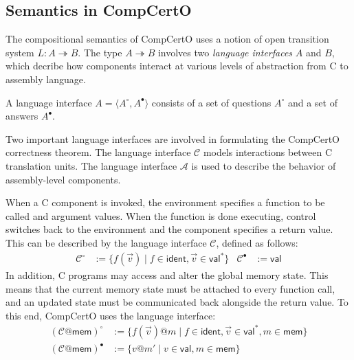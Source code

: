 \documentclass[acmsmall,screen,review,anonymous]{acmart}
\newcommand{\kw}[1]{\ensuremath{ \mathsf{#1} }}
\newcommand{\que}{\circ}
\newcommand{\ans}{\bullet}
\begin{document}

\subsection{Semantics in CompCertO} \label{sec:basic:compcerto} %

The compositional semantics of CompCertO uses %
a notion of open transition system $L : A \twoheadrightarrow B$.
The type $A \twoheadrightarrow B$ involves
two \emph{language interfaces} $A$ and $B$,
which decribe how components interact at various levels of abstraction
from C to assembly language.

\begin{definition} \label{def:li} %
A language interface $A = \langle A^\que, A^\ans \rangle$
consists of a set of questions $A^\que$ and a set of answers $A^\ans$.
\end{definition}

Two important language interfaces
are involved in formulating the CompCertO correctness theorem.
The language interface $\mathcal{C}$
models interactions between C translation units.
The language interface $\mathcal{A}$
is used to describe the behavior of assembly-level components.

\begin{example} %
When a C component is invoked,
the environment specifies a function to be called
and argument values.
When the function is done executing,
control switches back to the environment
and the component specifies a return value.
This can be described by the language interface $\mathcal{C}$,
defined as follows:
\begin{align*}
  \mathcal{C}^\que &:= \{ f(\vec{v}) \mid f \in \kw{ident}, \vec{v} \in \kw{val}^* \}
  &
  \mathcal{C}^\ans &:= \kw{val}
\end{align*}
In addition,
C programs may access and alter the global memory state.
This means that the current memory state must be attached
to every function call,
and an updated state must be communicated back
alongside the return value.
To this end, CompCertO uses the language interface:
\begin{align*}
  (\mathcal{C}@\kw{mem})^\que &:=
    \{ f(\vec{v})@m \mid f \in \kw{ident}, \vec{v} \in \kw{val}^*, m \in \kw{mem} \}
  \\
  (\mathcal{C}@\kw{mem})^\ans &:=
    \{ v@m' \mid v \in \kw{val}, m \in \kw{mem} \}
\end{align*}
\end{example}
\end{document}
